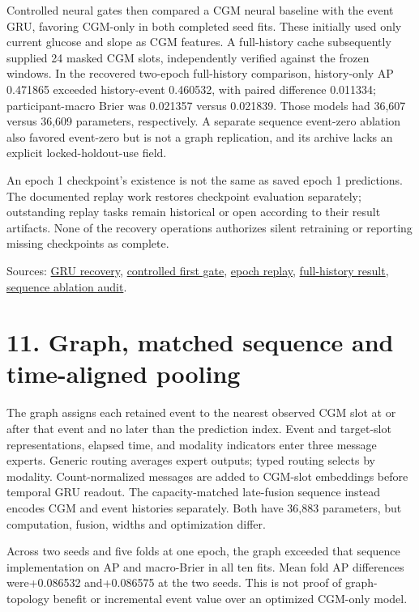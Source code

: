\documentclass[11pt,a4paper]{article}
\begin{document}
Controlled neural gates then compared a CGM neural baseline with the event GRU, favoring CGM-only in both completed seed fits. These initially used only current glucose and slope as CGM features. A full-history cache subsequently supplied 24 masked CGM slots, independently verified against the frozen windows. In the recovered two-epoch full-history comparison, history-only AP 0.471865 exceeded history-event 0.460532, with paired difference 0.011334; participant-macro Brier was 0.021357 versus 0.021839. Those models had 36,607 versus 36,609 parameters, respectively. A separate sequence event-zero ablation also favored event-zero but is not a graph replication, and its archive lacks an explicit locked-holdout-use field.

An epoch 1 checkpoint's existence is not the same as saved epoch 1 predictions. The documented replay work restores checkpoint evaluation separately; outstanding replay tasks remain historical or open according to their result artifacts. None of the recovery operations authorizes silent retraining or reporting missing checkpoints as complete.

Sources: \href{loop_gru_completed_validation.md}{GRU recovery}, \href{loop_controlled_first_gate_result_2026_10_05.md}{controlled first gate}, \href{loop_controlled_epoch1_replay_result_2026_10_11.md}{epoch replay}, \href{loop_full_history_result_2026_10_17.md}{full-history result}, \href{../audit/loop_full_history_event_ablation_outer0_seed20261003_paired_20261031.json}{sequence ablation audit}.

\section*{11. Graph, matched sequence and time-aligned pooling}
The graph assigns each retained event to the nearest observed CGM slot at or after that event and no later than the prediction index. Event and target-slot representations, elapsed time, and modality indicators enter three message experts. Generic routing averages expert outputs; typed routing selects by modality. Count-normalized messages are added to CGM-slot embeddings before temporal GRU readout. The capacity-matched late-fusion sequence instead encodes CGM and event histories separately. Both have 36,883 parameters, but computation, fusion, widths and optimization differ.

Across two seeds and five folds at one epoch, the graph exceeded that sequence implementation on AP and macro-Brier in all ten fits. Mean fold AP differences were+0.086532 and+0.086575 at the two seeds. This is not proof of graph-topology benefit or incremental event value over an optimized CGM-only model.
\end{document}
